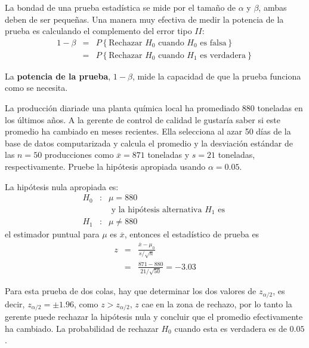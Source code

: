 \begin{frame}
\begin{frame}
\begin{Note}
\end{Note}
La bondad de una prueba estad\'istica se mide por el tama\~ no de $\alpha$ y $\beta$, ambas deben de ser peque\~ nas. Una manera muy efectiva de medir la potencia de la prueba es calculando el complemento del error tipo $II$:
\begin{eqnarray*}
1-\beta&= &P\left\{\textrm{Rechazar }H_{0}\textrm{ cuando }H_{0}\textrm{ es falsa}\right\}\\
&=&P\left\{\textrm{Rechazar }H_{0}\textrm{ cuando }H_{1}\textrm{ es verdadera}\right\}
\end{eqnarray*}
\begin{Def}
La \textbf{potencia de la prueba}, $1-\beta$, mide la capacidad de que la prueba funciona como se necesita.
\end{Def}





\begin{Ejem}
La producci\'on diariade una planta qu\'imica local ha promediado 880 toneladas en los \'ultimos a\~nos. A la gerente de control de calidad le gustar\'ia saber si este promedio ha cambiado en meses recientes. Ella selecciona al azar 50 d\'ias de la base de datos computarizada y calcula el promedio y la desviaci\'on est\'andar de las $n=50$  producciones como $\overline{x}=871$ toneladas y $s=21$ toneladas, respectivamente. Pruebe la hip\'otesis  apropiada usando $\alpha=0.05$.

\end{Ejem}

\begin{Sol}
La hip\'otesis nula apropiada es:
\begin{eqnarray*}
H_{0}&:& \mu=880\\
&&\textrm{ y la hip\'otesis alternativa }H_{1}\textrm{ es }\\
H_{1}&:& \mu\neq880
\end{eqnarray*}
el estimador puntual para $\mu$ es $\overline{x}$, entonces el estad\'istico de prueba es\medskip
\begin{eqnarray*}
z&=&\frac{\overline{x}-\mu_{0}}{s/\sqrt{n}}\\
&=&\frac{871-880}{21/\sqrt{50}}=-3.03
\end{eqnarray*}
\end{Sol}




\begin{Sol}
Para esta prueba de  dos colas, hay que determinar los dos valores de $z_{\alpha/2}$, es decir,  $z_{\alpha/2}=\pm1.96$, como $z>z_{\alpha/2}$, $z$ cae en la zona de rechazo, por lo tanto  la gerente puede rechazar la hip\'otesis nula y concluir que el promedio efectivamente ha cambiado.\medskip
La probabilidad de rechazar $H_{0}$ cuando esta es verdadera es de  $0.05$.



\end{Sol}
\end{frame}
\end{frame}
